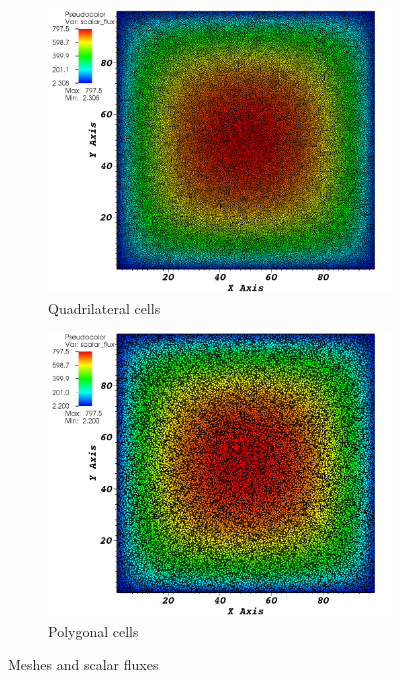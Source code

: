 \begin{figure}[H]
  \centering
  \begin{subfigure}{0.45\textwidth}
    \centering
    \includegraphics[width=\textwidth]{big_homog_quad_crop}
    \caption{Quadrilateral cells}
  \end{subfigure}
  \begin{subfigure}{0.45\textwidth}
    \centering
    \includegraphics[width=\textwidth]{big_homog_poly_crop}
    \caption{Polygonal cells}
  \end{subfigure}
  \caption{Meshes and scalar fluxes}
  \label{homog_test}
\end{figure}
